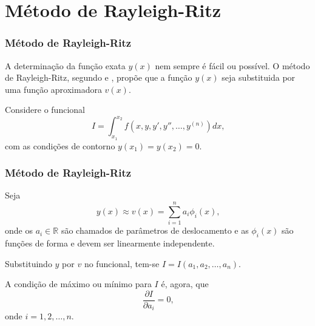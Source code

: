 \documentclass{beamer}
\newtheorem{lema}{Lema}
\begin{document}

	
	
	\section{Método de Rayleigh-Ritz}
	
	\begin{frame}
		\frametitle{Método de Rayleigh-Ritz}
		\justify
		
		A determinação da função exata $y(x)$ nem sempre é fácil ou possível. O método de Rayleigh-Ritz, segundo \cite{mefassan} e \cite{MRR_Deflex}, propõe que a função $y(x)$ seja substituida por uma função aproximadora $v(x)$.
		\vspace{10pt}
		\pause
		
		Considere o funcional
		$$
			I = \int_{x_1}^{x_2} f(x, y, y', y'', \dots, y^{(n)})dx\text{,}
		$$
		com as condições de contorno $y(x_1)=y(x_2)=0$.
	\end{frame}
	
	\begin{frame}
		\frametitle{Método de Rayleigh-Ritz}
		\justify
		
		Seja
		$$
			y(x) \approx v(x)=\sum_{i=1}^n a_i \phi_i(x)
			\text{,}
		$$
		onde os $a_i\in\mathbb{R}$ são chamados de parâmetros de deslocamento e as $\phi_i(x)$ são funções de forma e devem ser linearmente independente.
		\vspace{10pt}
		\pause
		
		Substituindo $y$ por $v$ no funcional, tem-se $I=I(a_1, a_2, \dots, a_n)$.
		\vspace{10pt}
		\pause
		
		A condição de máximo ou mínimo para $I$ é, agora, que
		$$
			\frac{\partial I}{\partial a_i} = 0
			\text{,}
		$$
		onde $i=1,2,\dots,n$.
	\end{frame}
	
\end{document}
